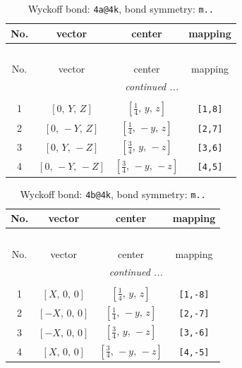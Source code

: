 \documentclass[fleqn,8pt]{jsarticle}
\begin{document}
\begin{longtable}{cccc}
\caption{Wyckoff bond: {\tt 4a@4k}, bond symmetry: {\tt m..}}
 \\
 \hline \hline
No. & vector & center & mapping \\ \hline \endfirsthead

\multicolumn{3}{l}{\tablename\ \thetable{}} \\
 \hline \hline
No. & vector & center & mapping \\ \hline \endhead

 \hline \hline
\multicolumn{3}{r}{\footnotesize\it continued ...} \\ \endfoot

 \hline \hline
\multicolumn{3}{r}{} \\ \endlastfoot

1 & $\left[ 0,\, Y,\, Z \right]$ & $\left[ \frac{1}{4},\, y,\, z \right]$ & {\tt [1,8]} \\ \hline
2 & $\left[ 0,\, - Y,\, Z \right]$ & $\left[ \frac{1}{4},\, - y,\, z \right]$ & {\tt [2,7]} \\ \hline
3 & $\left[ 0,\, Y,\, - Z \right]$ & $\left[ \frac{3}{4},\, y,\, - z \right]$ & {\tt [3,6]} \\ \hline
4 & $\left[ 0,\, - Y,\, - Z \right]$ & $\left[ \frac{3}{4},\, - y,\, - z \right]$ & {\tt [4,5]} \\
\end{longtable}
\renewcommand{\arraystretch}{1.2}
\begin{longtable}{cccc}
\caption{Wyckoff bond: {\tt 4b@4k}, bond symmetry: {\tt m..}}
 \\
 \hline \hline
No. & vector & center & mapping \\ \hline \endfirsthead

\multicolumn{3}{l}{\tablename\ \thetable{}} \\
 \hline \hline
No. & vector & center & mapping \\ \hline \endhead

 \hline \hline
\multicolumn{3}{r}{\footnotesize\it continued ...} \\ \endfoot

 \hline \hline
\multicolumn{3}{r}{} \\ \endlastfoot

1 & $\left[ X,\, 0,\, 0 \right]$ & $\left[ \frac{1}{4},\, y,\, z \right]$ & {\tt [1,-8]} \\ \hline
2 & $\left[ - X,\, 0,\, 0 \right]$ & $\left[ \frac{1}{4},\, - y,\, z \right]$ & {\tt [2,-7]} \\ \hline
3 & $\left[ - X,\, 0,\, 0 \right]$ & $\left[ \frac{3}{4},\, y,\, - z \right]$ & {\tt [3,-6]} \\ \hline
4 & $\left[ X,\, 0,\, 0 \right]$ & $\left[ \frac{3}{4},\, - y,\, - z \right]$ & {\tt [4,-5]} \\
\end{longtable}
\end{document}
